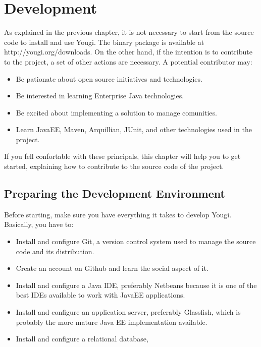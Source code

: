\documentclass[envcountsame,envcountchap]{svmono}
\begin{document}
\chapter{Development}

As explained in the previous chapter, it is not necessary to start from the source code to install and use Yougi. The binary package is available at http://yougi.org/downloads. On the other hand, if the intention is to contribute to the project, a set of other actions are necessary. A potential contributor may:

\begin{itemize}
\item Be pationate about open source initiatives and technologies.
\item Be interested in learning Enterprise Java technologies.
\item Be excited about implementing a solution to manage comunities.
\item Learn JavaEE, Maven, Arquillian, JUnit, and other technologies used in the project.
\end{itemize}

If you fell confortable with these principals, this chapter will help you to get started, explaining how to contribute to the source code of the project.

\section{Preparing the Development Environment}

Before starting, make sure you have everything it takes to develop Yougi. Basically, you have to:

\begin{itemize}
\item Install and configure Git, a version control system used to manage the source code and its distribution.
\item Create an account on Github and learn the social aspect of it.
\item Install and configure a Java IDE, preferably Netbeans because it is one of the best IDEs available to work with JavaEE applications.
\item Install and configure an application server, preferably Glassfish, which is probably the more mature Java EE implementation available.
\item Install and configure a relational database,  
\end{itemize}
\end{document}
